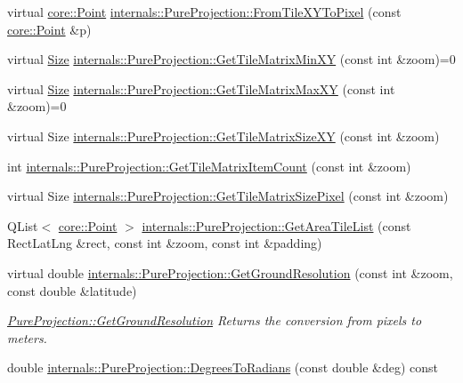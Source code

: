 \begin{DoxyCompactItemize}
\item 
virtual \hyperlink{structcore_1_1_point}{core\-::\-Point} \hyperlink{group___o_p_map_widget_ga6eb6b9db59d0e4e58f4e70c4d4d2887a}{internals\-::\-Pure\-Projection\-::\-From\-Tile\-X\-Y\-To\-Pixel} (const \hyperlink{structcore_1_1_point}{core\-::\-Point} \&p)
\item 
virtual \hyperlink{structcore_1_1_size}{\-Size} \hyperlink{group___o_p_map_widget_ga655cbf971f1a5d2df37f97d6e7b422f5}{internals\-::\-Pure\-Projection\-::\-Get\-Tile\-Matrix\-Min\-X\-Y} (const int \&zoom)=0
\item 
virtual \hyperlink{structcore_1_1_size}{\-Size} \hyperlink{group___o_p_map_widget_ga5588735ea108bf7743f87c86fe14f3f1}{internals\-::\-Pure\-Projection\-::\-Get\-Tile\-Matrix\-Max\-X\-Y} (const int \&zoom)=0
\item 
virtual \-Size \hyperlink{group___o_p_map_widget_ga4ae08027e37b2017b358d8fbe75ae5c6}{internals\-::\-Pure\-Projection\-::\-Get\-Tile\-Matrix\-Size\-X\-Y} (const int \&zoom)
\item 
int \hyperlink{group___o_p_map_widget_ga9729f2fced303b2b353fbb8349a16a18}{internals\-::\-Pure\-Projection\-::\-Get\-Tile\-Matrix\-Item\-Count} (const int \&zoom)
\item 
virtual \-Size \hyperlink{group___o_p_map_widget_ga2756c4a5e52399306da81bb913106474}{internals\-::\-Pure\-Projection\-::\-Get\-Tile\-Matrix\-Size\-Pixel} (const int \&zoom)
\item 
\-Q\-List$<$ \hyperlink{structcore_1_1_point}{core\-::\-Point} $>$ \hyperlink{group___o_p_map_widget_gab8c7480cc18ebba515ca1c9c4258a2fd}{internals\-::\-Pure\-Projection\-::\-Get\-Area\-Tile\-List} (const \-Rect\-Lat\-Lng \&rect, const int \&zoom, const int \&padding)
\item 
virtual double \hyperlink{group___o_p_map_widget_ga40a54138c94f8707cc2e2d9f2c5e1297}{internals\-::\-Pure\-Projection\-::\-Get\-Ground\-Resolution} (const int \&zoom, const double \&latitude)
\begin{DoxyCompactList}\small\item\em \hyperlink{group___o_p_map_widget_ga40a54138c94f8707cc2e2d9f2c5e1297}{\-Pure\-Projection\-::\-Get\-Ground\-Resolution} \-Returns the conversion from pixels to meters. \end{DoxyCompactList}\item 
double \hyperlink{group___o_p_map_widget_gaf5f3d8b3ad4c4fdb6ab6ff4bdb2b2584}{internals\-::\-Pure\-Projection\-::\-Degrees\-To\-Radians} (const double \&deg) const 
\item 

\end{DoxyCompactItemize}
